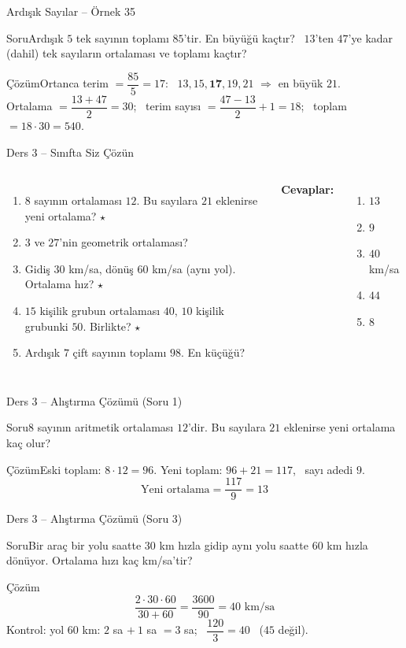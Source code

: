 \documentclass[aspectratio=169,11pt,handout]{beamer}
\newcommand{\soru}[3]{%
\begin{frame}{#1}
  \begin{block}{Soru}\large #2\end{block}
  \pause
  \begin{exampleblock}{Çözüm}\large #3\end{exampleblock}
\end{frame}}
\begin{document}
\soru{Ardışık Sayılar -- Örnek 35}
{Ardışık \(5\) tek sayının toplamı \(85\)'tir. En büyüğü kaçtır? \ \(13\)'ten \(47\)'ye kadar (dahil) tek sayıların ortalaması ve toplamı kaçtır?}
{Ortanca terim \(=\dfrac{85}{5}=17\): \ \(13,15,\mathbf{17},19,21\) \(\Rightarrow\) en büyük \(21\).\\[3pt]
Ortalama \(=\dfrac{13+47}{2}=30\); \ terim sayısı \(=\dfrac{47-13}{2}+1=18\); \ toplam \(=18\cdot 30=540\).}

\begin{frame}{Ders 3 -- Sınıfta Siz Çözün}
\begin{columns}[t]
\begin{enumerate}
\item \(8\) sayının ortalaması \(12\). Bu sayılara \(21\) eklenirse yeni ortalama? \(\star\)
\item \(3\) ve \(27\)'nin geometrik ortalaması?
\item Gidiş \(30\) km/sa, dönüş \(60\) km/sa (aynı yol). Ortalama hız? \(\star\)
\item \(15\) kişilik grubun ortalaması \(40\), \(10\) kişilik grubunki \(50\). Birlikte? \(\star\)
\item Ardışık \(7\) çift sayının toplamı \(98\). En küçüğü?
\end{enumerate}
\pause
\textbf{Cevaplar:}
\begin{enumerate}
\item \(13\)
\item \(9\)
\item \(40\) km/sa
\item \(44\)
\item \(8\)
\end{enumerate}
\end{columns}
\vspace{4pt}{\footnotesize \(\star\) işaretli soruların adım adım çözümü sonraki slaytlardadır.}
\end{frame}

\soru{Ders 3 -- Alıştırma Çözümü (Soru 1)}
{\(8\) sayının aritmetik ortalaması \(12\)'dir. Bu sayılara \(21\) eklenirse yeni ortalama kaç olur?}
{Eski toplam: \(8\cdot 12=96\). \quad Yeni toplam: \(96+21=117\), \ sayı adedi \(9\).
\[\text{Yeni ortalama}=\frac{117}{9}=13\]}

\soru{Ders 3 -- Alıştırma Çözümü (Soru 3)}
{Bir araç bir yolu saatte \(30\) km hızla gidip aynı yolu saatte \(60\) km hızla dönüyor. Ortalama hızı kaç km/sa'tir?}
{\[\frac{2\cdot 30\cdot 60}{30+60}=\frac{3600}{90}=40\text{ km/sa}\]
Kontrol: yol \(60\) km: \(2\) sa \(+\ 1\) sa \(=3\) sa; \ \(\dfrac{120}{3}=40\) \checkmark \ (\(45\) değil).}
\end{document}

